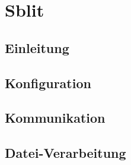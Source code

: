 \chapter{Sblit}
\renewcommand{\kapitelautor}{Autor: Nikola Szucsich}

\section{Einleitung} \label{Einleitung}


\section{Konfiguration} \label{Konfiguration}


\section{Kommunikation} \label{Kommunikation}


\section{Datei-Verarbeitung} \label{Dateiverarbeitung}

